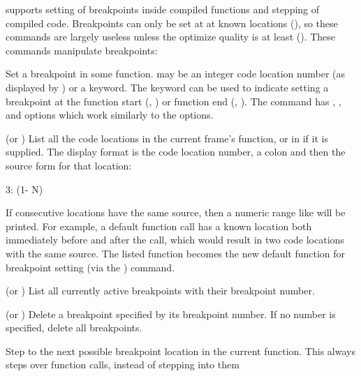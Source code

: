 \cmucl{} supports setting of breakpoints inside compiled functions and
stepping of compiled code.  Breakpoints can only be set at at known
locations (), so these commands are largely
useless unless the  optimize quality is at least 
().  These commands manipulate breakpoints:
\begin{Lentry}
\item[\code{breakpoint} \var{location} \mstar{\var{option} \var{value}}]
Set a breakpoint in some function.   may be an integer
code location number (as displayed by ) or a
keyword.  The keyword can be used to indicate setting a breakpoint at
the function start (, ) or function end
(, ).  The  command has
, ,  and 
options which work similarly to the  options.

\item[\code{list-locations} (or \code{ll}) \mopt{\var{function}}]%
List all the code locations in the current frame's function, or in
 if it is supplied.  The display format is the code
location number, a colon and then the source form for that location:
\begin{example}
3: (1- N)
\end{example}
If consecutive locations have the same source, then a numeric range like
 will be printed.  For example, a default function call has a
known location both immediately before and after the call, which would
result in two code locations with the same source.  The listed function
becomes the new default function for breakpoint setting (via the
) command.

\item[\code{list-breakpoints} (or \code{lb})]%
List all currently active breakpoints with their breakpoint number.

\item[\code{delete-breakpoint} (or \code{db}) \mopt{\var{number}}]%
Delete a breakpoint specified by its breakpoint number.  If no number is
specified, delete all breakpoints.

\item[\code{step}]%
Step to the next possible breakpoint location in the current function.
This always steps over function calls, instead of stepping into them
\end{Lentry}


